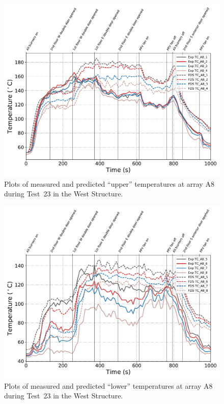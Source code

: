 \begin{figure}[!h]
	\centering
	\includegraphics[width=\columnwidth]{Figures/Plots/Validation/Temperature/Test_23_TC_A8_upper}
	\caption{Plots of measured and predicted ``upper'' temperatures at array A8 during Test~23 in the West Structure.}
	\label{fig:TCA8_upper_data_Test23}
\end{figure}

\begin{figure}[!h]
	\centering
	\includegraphics[width=\columnwidth]{Figures/Plots/Validation/Temperature/Test_23_TC_A8_lower}
	\caption{Plots of measured and predicted ``lower'' temperatures at array A8 during Test~23 in the West Structure.}
	\label{fig:TCA8_lower_data_Test23}
\end{figure}

